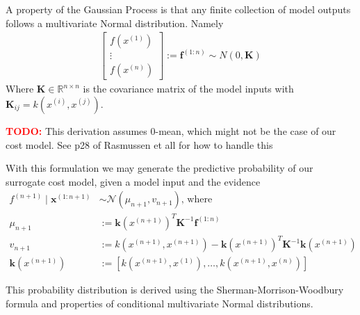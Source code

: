 \documentclass[10pt,twocolumn,letterpaper]{article}
\begin{document}
A property of the Gaussian Process is that any finite collection of model outputs follows a multivariate Normal distribution. Namely
\begin{align*}
    \begin{bmatrix}
        f(x^{(1)})\\\vdots\\f(x^{(n)})
    \end{bmatrix} := \textbf{f}^{(1:n)} \sim N(0, \textbf{K})
\end{align*}
Where $\textbf{K}\in \mathbb{R}^{n\times n}$ is the covariance matrix of the model inputs with $\textbf{K}_{ij} = k(x^{(i)}, x^{(j)})$.

\textcolor{red}{\textbf{TODO:}} This derivation assumes 0-mean, which might not be the case of our cost model. See p28 of Rasmussen et all for how to handle this \cite{Rasmussen}

With this formulation we may generate the predictive probability of our surrogate cost model, given a model input and the evidence
\begin{align*}
    f^{(n+1)} \mid \textbf{x}^{(1:n+1)} &\sim \mathcal{N}(\mu_{n+1}, v_{n+1}) \textrm{, where}\\
    \mu_{n+1} &:= \textbf{k}(x^{(n+1)})^T\textbf{K}^{-1}\textbf{f}^{(1:n)}\\
    v_{n+1} &:= k(x^{(n+1)}, x^{(n+1)}) - \textbf{k}(x^{(n+1)})^T\textbf{K}^{-1}\textbf{k}(x^{(n+1)})\\
    \textbf{k}(x^{(n+1)}) &:= \left[k(x^{(n+1)}, x^{(1)}), \dots, k(x^{(n+1)}, x^{(n)})\right]
\end{align*}

This probability distribution is derived using the Sherman-Morrison-Woodbury formula and properties of conditional multivariate Normal distributions. 
\end{document}
